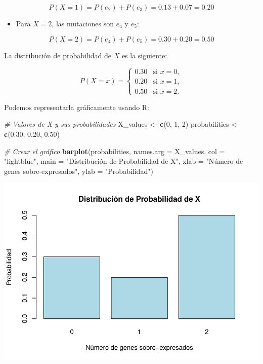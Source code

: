\documentclass[
]{article}
\newenvironment{Shaded}{\begin{snugshade}}{\end{snugshade}}
\newcommand{\AttributeTok}[1]{\textcolor[rgb]{0.13,0.29,0.53}{#1}}
\newcommand{\CommentTok}[1]{\textcolor[rgb]{0.56,0.35,0.01}{\textit{#1}}}
\newcommand{\DecValTok}[1]{\textcolor[rgb]{0.00,0.00,0.81}{#1}}
\newcommand{\FloatTok}[1]{\textcolor[rgb]{0.00,0.00,0.81}{#1}}
\newcommand{\FunctionTok}[1]{\textcolor[rgb]{0.13,0.29,0.53}{\textbf{#1}}}
\newcommand{\NormalTok}[1]{#1}
\newcommand{\OtherTok}[1]{\textcolor[rgb]{0.56,0.35,0.01}{#1}}
\newcommand{\StringTok}[1]{\textcolor[rgb]{0.31,0.60,0.02}{#1}}
\providecommand{\tightlist}{%
  \setlength{\itemsep}{0pt}\setlength{\parskip}{0pt}}
\begin{document}
\[
P(X = 1) = P(e_2) + P(e_3) = 0.13 + 0.07 = 0.20
\]

\begin{itemize}
\tightlist
\item
  Para \(X = 2\), las mutaciones son \(e_4\) y \(e_5\):
\end{itemize}

\[
P(X = 2) = P(e_4) + P(e_5) = 0.30 + 0.20 = 0.50
\]

La distribución de probabilidad de \(X\) es la siguiente:

\[
P(X = x) =
\begin{cases}
0.30 & \text{si } x = 0, \\
0.20 & \text{si } x = 1, \\
0.50 & \text{si } x = 2.
\end{cases}
\]

Podemos representarla gráficamente usando R:

\begin{Shaded}
\begin{Highlighting}[]
\CommentTok{\# Valores de X y sus probabilidades}
\NormalTok{X\_values }\OtherTok{\textless{}{-}} \FunctionTok{c}\NormalTok{(}\DecValTok{0}\NormalTok{, }\DecValTok{1}\NormalTok{, }\DecValTok{2}\NormalTok{)}
\NormalTok{probabilities }\OtherTok{\textless{}{-}} \FunctionTok{c}\NormalTok{(}\FloatTok{0.30}\NormalTok{, }\FloatTok{0.20}\NormalTok{, }\FloatTok{0.50}\NormalTok{)}

\CommentTok{\# Crear el gráfico}
\FunctionTok{barplot}\NormalTok{(probabilities, }\AttributeTok{names.arg =}\NormalTok{ X\_values, }\AttributeTok{col =} \StringTok{"lightblue"}\NormalTok{,}
        \AttributeTok{main =} \StringTok{"Distribución de Probabilidad de X"}\NormalTok{,}
        \AttributeTok{xlab =} \StringTok{"Número de genes sobre{-}expresados"}\NormalTok{, }\AttributeTok{ylab =} \StringTok{"Probabilidad"}\NormalTok{)}
\end{Highlighting}
\end{Shaded}

\includegraphics{EjerciciosInferenciaEstadistica_files/figure-latex/unnamed-chunk-7-1.pdf}
\end{document}
